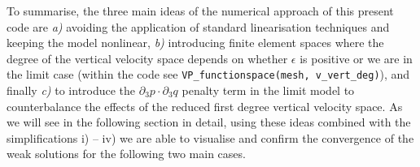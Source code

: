\documentclass[12pt]{report}
\numberwithin{theorem}{chapter}
\numberwithin{corollary}{chapter}
\numberwithin{lemma}{chapter}
\numberwithin{remark}{chapter}
\numberwithin{definition}{chapter}
\numberwithin{prop}{chapter}
\begin{document}
To summarise, the three main ideas of the numerical approach of this present code are \textit{a)} avoiding the application of standard linearisation techniques and keeping the model nonlinear, \textit{b)} introducing finite element spaces where the degree of the vertical velocity space depends on whether $\epsilon$ is positive or we are in the limit case (within the code see \texttt{VP\_functionspace(mesh, v\_vert\_deg)}), and finally \textit{c)} to introduce the $\partial_3 p \cdot \partial_3 q$ penalty term in the limit model to counterbalance the effects of the reduced first degree vertical velocity space. As we will see in the following section in detail, using these ideas combined with the simplifications i) -- iv) we are able to visualise and confirm the convergence of the weak solutions for the following two main cases.
\end{document}
